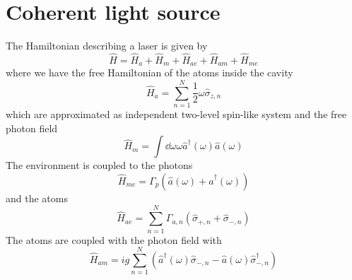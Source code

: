 \section{Coherent light source}

The Hamiltonian describing a laser is given by
\begin{equation}
	\hat{H}
	=
	\hat{H}_a
	+
	\hat{H}_m
	+
	\hat{H}_{ae}
	+
	\hat{H}_{am}
	+
	\hat{H}_{me}
\end{equation}
where we have the free Hamiltonian of the atoms inside the cavity
\begin{equation}
	\hat{H}_a
	=
	\sum_{n=1}^N
	\frac{1}{2}
	\omega
	\hat\sigma_{z,n}
\end{equation}
which are approximated as independent two-level spin-like system and the free photon field
\begin{equation}
	\hat{H}_m
	=
	\int\dd{\omega}
	\omega
	\hat{a}^\dagger(\omega)
	\hat{a}(\omega)
\end{equation}
The environment is coupled to the photons
\begin{equation}
	\hat{H}_{me}
	=
	\Gamma_p
	\left(
		\hat{a}(\omega)
		+
		\hat{a}^\dagger(\omega)
	\right)
\end{equation}
and the atoms
\begin{equation}
	\hat{H}_{ae}
	=
	\sum_{n=1}^N
	\Gamma_{a,n}
	\left(
		\hat\sigma_{+,n}
		+
		\hat\sigma_{-,n}
	\right)
\end{equation}
The atoms are coupled with the photon field with
\begin{equation}
	\hat{H}_{am}
	=
	ig
	\sum_{n=1}^N
	\left(
		\hat{a}^\dagger(\omega)
		\hat\sigma_{-,n}
		-
		\hat{a}(\omega)
		\hat\sigma_{-,n}^\dagger
	\right)
\end{equation}